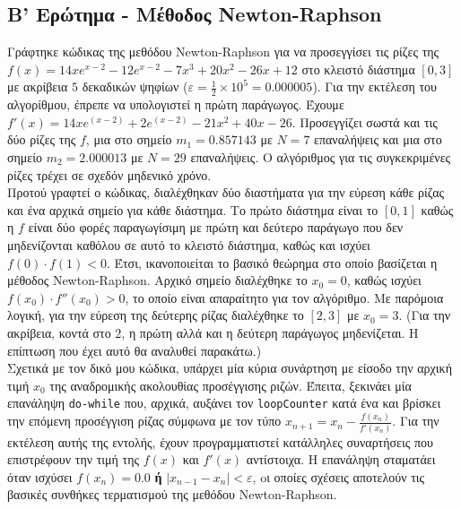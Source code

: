 \documentclass[a4paper, 14pt]{article}   %
\begin{document}
\vspace{2\baselineskip}

\subsection*{Β' Ερώτημα - Μέθοδος Newton-Raphson}  %

Γράφτηκε κώδικας της μεθόδου Newton-Raphson για να προσεγγίσει τις ρίζες της \(f(x) = 14xe^{x-2} - 12e^{x-2} - 7x^3 + 20x^2 - 26x + 12\) στο κλειστό διάστημα \([0,3]\) με ακρίβεια $5$ δεκαδικών ψηφίων (\(\varepsilon = \frac{1}{2} \times 10^5 = 0.000005\)). Για την εκτέλεση του αλγορίθμου, έπρεπε να υπολογιστεί η πρώτη παράγωγος. Έχουμε \(f'(x) = 14xe^{(x-2)} + 2e^{(x-2)} - 21x^2 + 40x - 26\). Προσεγγίζει σωστά και τις δύο ρίζες της \(f\), μια στο σημείο \(m_1 = 0.857143\) με \(N = 7\) επαναλήψεις και μια στο σημείο \(m_2 = 2.000013\) με \(N = 29\) επαναλήψεις. Ο αλγόριθμος για τις συγκεκριμένες ρίζες τρέχει σε σχεδόν μηδενικό χρόνο.\\

Προτού γραφτεί ο κώδικας, διαλέχθηκαν δύο διαστήματα για την εύρεση κάθε ρίζας και ένα αρχικά σημείο για κάθε διάστημα. Το πρώτο διάστημα είναι το \([0,1]\) καθώς η \(f\) είναι δύο φορές παραγωγίσιμη με πρώτη και δεύτερο παράγωγο που δεν μηδενίζονται καθόλου σε αυτό το κλειστό διάστημα, καθώς και ισχύει \(f(0) \cdot f(1)<0\). Έτσι, ικανοποιείται το βασικό θεώρημα στο οποίο βασίζεται η μέθοδος Newton-Raphson. Αρχικό σημείο διαλέχθηκε το \(x_0=0\), καθώς ισχύει \(f(x_0) \cdot f''(x_0) > 0\), το οποίο είναι απαραίτητο για τον αλγόριθμο. Με παρόμοια λογική, για την εύρεση της δεύτερης ρίζας διαλέχθηκε το \([2,3]\) με \(x_0=3\). (Για την ακρίβεια, κοντά στο 2, η πρώτη αλλά και η δεύτερη παράγωγος μηδενίζεται. Η επίπτωση που έχει αυτό θα αναλυθεί παρακάτω.)\\

Σχετικά με τον δικό μου κώδικα, υπάρχει μία κύρια συνάρτηση με είσοδο την αρχική τιμή \(x_0\) της αναδρομικής ακολουθίας προσέγγισης ριζών. Έπειτα, ξεκινάει μία επανάληψη \texttt{do-while} που, αρχικά, αυξάνει τον \texttt{loopCounter} κατά ένα και βρίσκει την επόμενη προσέγγιση ρίζας σύμφωνα με τον τύπο \(x_{n+1} = x_n - \frac{f(x_n)}{f'(x_n)}\). Για την εκτέλεση αυτής της εντολής, έχουν προγραμματιστεί κατάλληλες συναρτήσεις που επιστρέφουν την τιμή της \(f(x)\) και \(f'(x)\) αντίστοιχα. Η επανάληψη σταματάει όταν ισχύσει \(f(x_{n}) = 0.0\) \textbf{ή} \(|x_{n-1} - x_n| < \varepsilon\), oι οποίες σχέσεις αποτελούν τις βασικές συνθήκες τερματισμού της μεθόδου Newton-Raphson.\\
\end{document}
